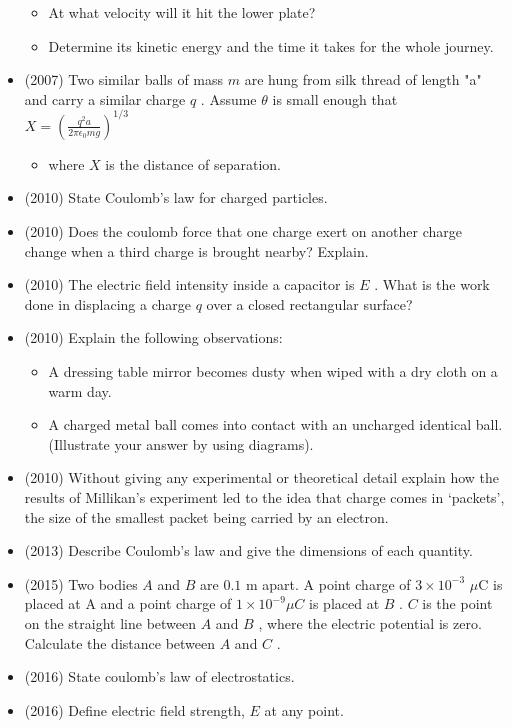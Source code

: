 \documentclass{article}
\begin{document}
\begin{itemize}
\begin{itemize}
\item At what velocity will it hit the lower plate?
\item Determine its kinetic energy and the time it takes for the whole journey.
\end{itemize}
\item (2007)  Two similar balls of mass $ m$ are hung from silk thread of length "a" and carry a similar charge $ q$ .  Assume $ \theta $ is small enough that $ X = (\frac{q^2 a}{2 \pi \epsilon_0 m g})^{1/3}$
 \begin{itemize}
\item where $ X$ is the distance of separation.
\end{itemize}
\item (2010)  State Coulomb’s law for charged particles.
\item (2010)  Does the coulomb force that one charge exert on another charge change when a third charge is brought nearby? Explain.
\item (2010)  The electric field intensity inside a capacitor is $ E$ . What is the work done in displacing a charge $ q$ over a closed rectangular surface?
\item (2010)  Explain the following observations:
 \begin{itemize}
\item A dressing table mirror becomes dusty when wiped with a dry cloth on a warm day.
\item A charged metal ball comes into contact with an uncharged identical ball.  (Illustrate your answer by using diagrams).
\end{itemize}
\item (2010)  Without giving any experimental or theoretical detail explain how the results of Millikan’s experiment led to the idea that charge comes in ‘packets’, the size of the smallest packet being carried by an electron. 
\item (2013)  Describe Coulomb’s law and give the dimensions of each quantity.
\item (2015)  Two bodies $ A$ and $ B$ are $ 0.1$ m apart.  A point charge of $ 3\times 10^{-3}$ $\mu$C is placed at A and a point charge of $ 1\times 10^{-9}\mu C$ is placed at $ B$ .  $ C$ is the point on the straight line between $ A$ and $ B$ , where the electric potential is zero.  Calculate the distance between $ A$ and $ C$ .
\item (2016)  State coulomb’s law of electrostatics.
\item (2016)  Define electric field strength, $ E$ at any point.

\end{itemize}
\end{document}
